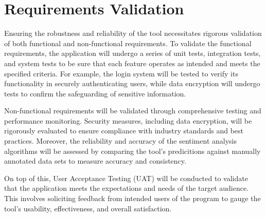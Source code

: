 \section{Requirements Validation}
Ensuring the robustness and reliability of the tool necessitates rigorous validation of both functional and non-functional requirements. To validate the functional requirements, the application will undergo a series of unit tests, integration tests, and system tests to be sure that each feature operates as intended and meets the specified criteria. For example, the login system will be tested to verify its functionality in securely authenticating users, while data encryption will undergo tests to confirm the safeguarding of sensitive information.

Non-functional requirements will be validated through comprehensive testing and performance monitoring. Security measures, including data encryption, will be rigorously evaluated to ensure compliance with industry standards and best practices. Moreover, the reliability and accuracy of the sentiment analysis algorithms will be assessed by comparing the tool's predicitions against manually annotated data sets to measure accuracy and consistency.

On top of this, User Acceptance Testing (UAT) will be conducted to validate that the application meets the expectations and needs of the target audience. This involves soliciting feedback from intended users of the program to gauge the tool's usability, effectiveness, and overall satisfaction.